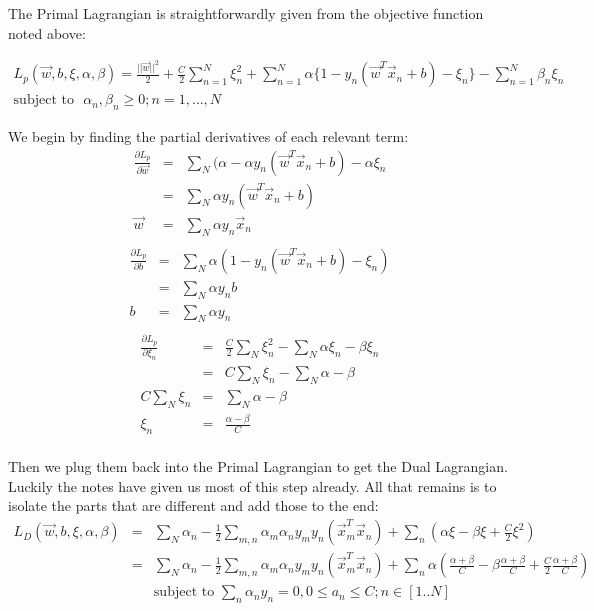 \documentclass[fleqn]{article}
\begin{document}
\begin{solution}
The Primal Lagrangian is straightforwardly given from the objective function noted above:

\begin{gather*}
L_p(\vec{w}, b, \xi, \alpha, \beta) = \frac{||\vec{w}||^2}{2} + \frac{C}{2} \sum_{n=1}^N \xi_n^2 + \sum_{n=1}^N \alpha\{1-y_n(\vec{w}^T \vec{x}_n + b) - \xi_n\} - \sum_{n=1}^N \beta_n \xi_n \\
\text{subject to}\ \ \ \alpha_n, \beta_n \ge 0; n  = 1, \ldots, N
\end{gather*}

We begin by finding the partial derivatives of each relevant term:
\begin{eqnarray*}
\frac{\partial L_p}{\partial \vec{w}} & = & \sum_N (\alpha - \alpha y_n(\vec{w}^T \vec{x}_n + b) - \alpha \xi_n \\
& = & \sum_N \alpha y_n(\vec{w}^T \vec{x}_n + b) \\
\vec{w} & = & \sum_N \alpha y_n \vec{x}_n \\
\end{eqnarray*}
\begin{eqnarray*}
\frac{\partial L_p}{\partial b} & = & \sum_N \alpha(1-y_n(\vec{w}^T \vec{x}_n + b) - \xi_n) \\
& = & \sum_N \alpha y_n b \\
b & = & \sum_N \alpha y_n \\
\end{eqnarray*}
\begin{eqnarray*}
\frac{\partial L_p}{\partial \xi_n} & = & \frac{C}{2} \sum_N \xi_n^2 - \sum_N \alpha \xi_n - \beta \xi_n \\
& = & C \sum_N \xi_n - \sum_N \alpha - \beta \\
C \sum_N \xi_n & = & \sum_N \alpha - \beta \\
\xi_n & = & \frac{\alpha - \beta}{C} \\
\end{eqnarray*}

Then we plug them back into the Primal Lagrangian to get the Dual Lagrangian. Luckily the notes have given us most of this step already. All that remains is to isolate the parts that are different and add those to the end:
\begin{eqnarray*}
L_D(\vec{w}, b, \xi, \alpha, \beta) & = & \sum_N \alpha_n - \frac{1}{2} \sum_{m,n} \alpha_m \alpha_n y_m y_n (\vec{x}^T_m \vec{x}_n) + \sum_n (\alpha \xi - \beta \xi + \frac{C}{2} \xi^2) \\
& = & \sum_N \alpha_n - \frac{1}{2} \sum_{m,n} \alpha_m \alpha_n y_m y_n (\vec{x}^T_m \vec{x}_n) + \sum_n \alpha (\frac{\alpha + \beta}{C} - \beta \frac{\alpha + \beta}{C} + \frac{C}{2} \frac{\alpha + \beta}{C}) \\
& & \text{subject to } \sum_n \alpha_n y_n = 0, 0 \le a_n \le C; n \in [1..N]
\end{eqnarray*}

\end{solution}
\end{document}
